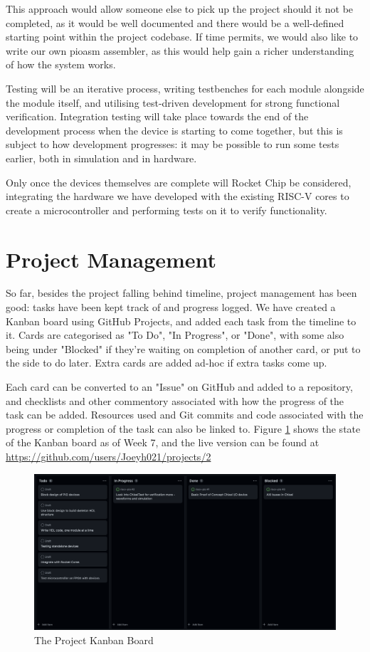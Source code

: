 \documentclass[a4paper,fleqn,12pt]{article}
\begin{document}
This approach would allow someone else to pick up the project should it not be completed, as it would be well documented and there would be a well-defined starting point within the project codebase. If time permits, we would also like to write our own pioasm assembler, as this would help gain a richer understanding of how the system works.

Testing will be an iterative process, writing testbenches for each module alongside the module itself, and utilising test-driven development for strong functional verification. Integration testing will take place towards the end of the development process when the device is starting to come together, but this is subject to how development progresses: it may be possible to run some tests earlier, both in simulation and in hardware.

Only once the devices themselves are complete will Rocket Chip be considered, integrating the hardware we have developed with the existing RISC-V cores to create a microcontroller and performing tests on it to verify functionality.

\section{Project Management}

So far, besides the project falling behind timeline, project management has been good: tasks have been kept track of and progress logged. We have created a Kanban board using GitHub Projects, and added each task from the timeline to it. Cards are categorised as "To Do", "In Progress", or "Done", with some also being under "Blocked" if they're waiting on completion of another card, or put to the side to do later. Extra cards are added ad-hoc if extra tasks come up.

Each card can be converted to an "Issue" on GitHub and added to a repository, and checklists and other commentory associated with how the progress of the task can be added. Resources used and Git commits and code associated with the progress or completion of the task can also be linked to. Figure \ref{fig:kanban} shows the state of the Kanban board as of Week 7, and the live version can be found at \url{https://github.com/users/Joeyh021/projects/2}

\begin{figure}[h!]
    \centering
    \includegraphics[width=\textwidth]{../img/kanban-wk6.png}
    \caption{The Project Kanban Board}
    \label{fig:kanban}
\end{figure}
\end{document}
